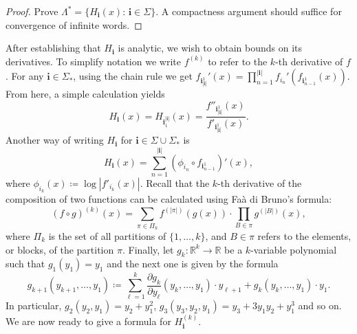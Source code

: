 \documentclass[12pt,]{article}
\theoremstyle{definition}
\theoremstyle{remark}
\renewcommand{\Bbb}[1]{\mathbb{#1}}
\newcommand{\bbR}{{\Bbb R}}        %
\newcommand{\0}{\mathbf{0}}
\newcommand{\bi}{\mathbf{i}}
\begin{document}
{\begin{proof}
{\color{red} Prove $\Lambda^*=\{H_{\bi}(x):\, \bi\in\Sigma\}$. A compactness argument should suffice
for convergence of infinite words.}
\end{proof}

After establishing that $H_{\bi}$ is analytic, we wish to obtain bounds on its derivatives. To simplify notation we write $f^{(k)}$ to refer to the $k$-th derivative of $f$. 
For any $\bi\in\Sigma_*$, using the chain rule we get $f_{\bi_{|\bi|}^1}'(x)= \prod_{n=1}^{|\bi|}f_{i_n}'(f_{\bi_{n-1}^1}(x))$. From here, a simple calculation yields %
\begin{equation}\label{eq:H=f''/f'}
H_{\bi}(x)=H_{\bi_1^{|\bi|}}(x) = \frac{f''_{\bi_{|\bi|}^1}(x)}{f'_{\bi_{|\bi|}^1}(x)}.
\end{equation}
Another way of writing $H_{\bi}$ for $\bi\in\Sigma\cup\Sigma_*$ is
\begin{equation}
	H_{\bi}(x) = \sum_{n=1}^{|\bi|} (\phi_{i_n}\circ f_{\bi_{n-1}^1})'(x),
	\label{eq:alternativeH}
\end{equation}
where $\phi_{i_k}(x)\coloneqq \log|f'_{i_k}(x)|$. Recall that the $k$-th derivative of the composition of two functions can be calculated using Fa\`a di Bruno's formula:
\begin{equation}\label{eq:FaaDiBruno}
(f\circ g)^{(k)}(x) = \sum_{\pi\in \Pi_k} f^{(|\pi|)}(g(x)) \cdot \prod_{B\in\pi}
g^{(|B|)}(x),
\end{equation}
where $\Pi_k$ is the set of all partitions of $\{1,\dots,k\}$, and $B\in \pi$ refers to the elements, or blocks, of the partition $\pi$. Finally, let $g_k:\bbR^k\to \bbR$ be a $k$-variable polynomial such that $g_1(y_1)=y_1$ and the next one is given by the formula
\[
g_{k+1}(y_{k+1},\dots,y_1)\coloneqq \sum_{\ell=1}^k \frac{\partial g_k}{\partial y_{\ell}}(y_k,\dots,y_1)\cdot y_{\ell+1} +
g_k(y_k,\dots,y_1)\cdot y_1.
\]
In particular, $g_2(y_2,y_1)=y_2+y_1^2$, $g_3(y_3,y_2,y_1) = y_3+3y_1y_2+y_1^3$ and so on. We are now ready to give a formula for $H_{\bi}^{(k)}$.


}
\end{document}

